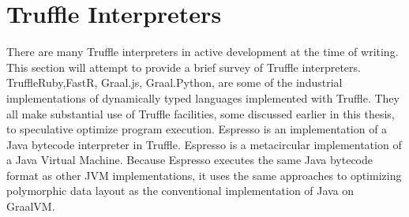 \section{Truffle Interpreters}

There are many Truffle interpreters in active development at the time of writing.
This section will attempt to provide a brief survey of Truffle interpreters.
TruffleRuby\cite{trufflyruby:specialization}\cite{truffleruby:object-model},FastR, Graal.js, Graal.Python,\cite{truffle:thesis} are some of the industrial implementations of dynamically typed languages implemented with Truffle.
They all make substantial use of Truffle facilities, some discussed earlier in this thesis, to speculative optimize program execution. 
Espresso\cite{graalvm:espresso} is an implementation of a Java bytecode interpreter in Truffle. 
Espresso is a metacircular implementation of a Java Virtual Machine.
Because Espresso executes the same Java bytecode format as other JVM implementations, it uses the same approaches to optimizing polymorphic data layout as the conventional implementation of Java on GraalVM.


